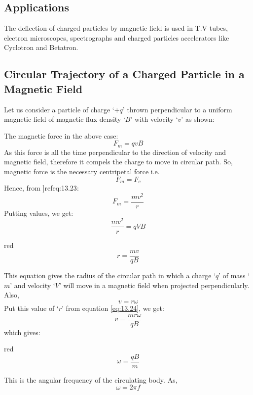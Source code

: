\subsection*{Applications}
The deflection of charged particles by magnetic field is used in T.V tubes, electron microscopes, spectrographs and charged particles accelerators like Cyclotron and Betatron.

\subsection{Circular Trajectory of a Charged Particle in a Magnetic Field}
Let us consider a particle of charge ‘$+q$’ thrown perpendicular to a uniform magnetic field of magnetic flux density ‘$B$’ with velocity ‘$v$’ as shown:



The magnetic force in the above case:
\begin{equation}\label{eq:13.23}
    F_{m} = qvB
\end{equation}
As this force is all the time perpendicular to the direction of velocity and magnetic field, therefore it compels the charge to move in circular path. So, magnetic force is the necessary centripetal force i.e.
\begin{equation}\nonumber
    F_{m}=F_{c}
\end{equation}
Hence, from ]ref{eq:13.23}:
\begin{equation}\nonumber
    F_{m}=\frac{mv^{2}}{r}
\end{equation}
Putting values, we get: 
\begin{equation}\nonumber
    \frac{mv^{2}}{r} = qVB
\end{equation}
\begin{mybox}{red}{}
\begin{equation}\label{eq:13.24}
    r=\frac{mv}{qB}
\end{equation}
\end{mybox}
\noindent This equation gives the radius of the circular path in which a charge ‘$q$’ of mass ‘$m$’ and velocity ‘$V$’ will move in a magnetic field when projected perpendicularly.
Also,
\begin{equation}\nonumber
     v = r\omega
\end{equation}
Put this value of `$r$' from equation \ref{eq:13.24}, we get:
\begin{equation}\nonumber
    v = \frac{mr\omega}{qB}
\end{equation}
which gives:
\begin{mybox}{red}{}
\begin{equation}\label{eq:13.25}
    \omega=\frac{qB}{m}
\end{equation}
\end{mybox}
\noindent This is the angular frequency of the circulating body.
As,
\begin{equation}\nonumber
    \omega = 2 \pi f
\end{equation}


